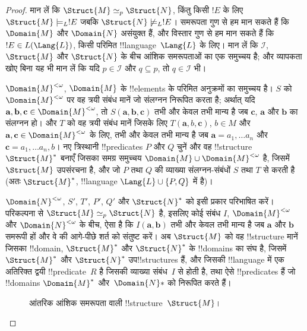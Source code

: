 \documentclass[../../../include/open-logic-section]{subfiles}
\begin{document}
\begin{proof}
मान लें कि $\Struct{M} \simeq_p \Struct{N}$, किंतु किसी $!E$ के लिए
$\Struct{M} \models_L !E$ जबकि $\Struct{N} \not\models_L !E$। समरूपता
गुण से हम मान सकते हैं कि $\Domain{M}$ और $\Domain{N}$ असंयुक्त हैं, और
विस्तार गुण से हम मान सकते हैं कि $!E \in
L(\Lang{L})$, किसी परिमित !!{language}~$\Lang{L}$ के लिए। मान लें कि
$\mathcal{I}$, $\Struct{M}$ और
$\Struct{N}$ के बीच आंशिक समरूपताओं का एक समुच्चय है; और व्यापकता खोए बिना
यह भी मान लें कि यदि $p
\in \mathcal{I}$ और $q \subseteq p$, तो
$q \in \mathcal{I}$ भी।

$\Domain{M}^{<\omega}$, $\Domain{M}$ के !!{element}s के परिमित अनुक्रमों
का समुच्चय है। $S$ को $\Domain{M}^{<\omega}$ पर वह त्रयी संबंध मानें जो
संलग्नन निरूपित करता है; अर्थात् यदि $\mathbf{a}, \mathbf{b},
\mathbf{c} \in \Domain{M}^{<\omega}$, तो $S(\mathbf{a}, \mathbf{b},
\mathbf{c})$ तभी और केवल तभी मान्य है जब $\mathbf{c}$, $\mathbf{a}$ और
$\mathbf{b}$ का संलग्नन हो। और $T$ को वह त्रयी संबंध मानें जिसके लिए
$T(\mathbf{a}, b, \mathbf{c})$, $b \in M$ और
$\mathbf{a}, \mathbf{c} \in \Domain{M}^{<\omega}$ के लिए, तभी और केवल तभी मान्य है जब $\mathbf{a} =
a_1, \dots a_n$ और $\mathbf{c} = a_1, \dots a_n, b$। नए त्रिस्थानी
!!{predicate}s $P$ और $Q$ चुनें और वह !!{structure} $\Struct{M}^*$ बनाएँ
जिसका समग्र समुच्चय $\Domain{M} \cup \Domain{M}^{<\omega}$ है, जिसमें
$\Struct{M}$ उपसंरचना है, और जो $P$ तथा $Q$ की व्याख्या संलग्नन-संबंधों
$S$ तथा $T$ से करती है (अतः $\Struct{M}^*$, !!{language} $\Lang{L} \cup \{ P, Q\}$ में है)।

$\Domain{N}^{<\omega}$, $S'$, $T'$, $P'$, $Q'$ और
$\Struct{N}^*$ को इसी प्रकार परिभाषित करें। परिकल्पना से $\Struct{M} \simeq_p
\Struct{N}$ है, इसलिए कोई संबंध $I$, $\Domain{M}^{<\omega}$ और
$\Domain{N}^{<\omega}$ के बीच, ऐसा है कि $I(\mathbf{a}, \mathbf{b})$
तभी और केवल तभी मान्य है जब $\mathbf{a}$ और $\mathbf{b}$ समरूपी हों और
वे
 की आगे-पीछे शर्त को संतुष्ट करें। अब $\Struct{M}$ को वह
!!{structure} मानें जिसका !!{domain},
$\Struct{M}^*$ और $\Struct{N}^*$ के !!{domain}s का संघ है, जिसमें $\Struct{M}^*$ और
$\Struct{N}^*$ उप!!{structure}s हैं, और जिसकी !!{language} में एक अतिरिक्त
द्वयी !!{predicate}~$R$ है जिसकी व्याख्या संबंध~$I$ से होती है, तथा ऐसे
!!{predicate}s हैं जो !!{domain}s $\Domain{M}^*$
और~$\Domain{N}*$ को निरूपित करते हैं।

\begin{figure}[h]
  \centering
  \caption{आंतरिक आंशिक समरूपता वाली !!{structure}~$\Struct{M}$।}
\end{figure}


\end{proof}
\end{document}

